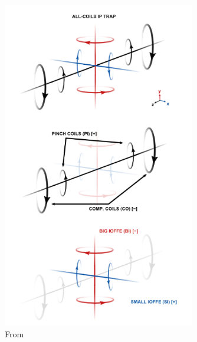 \documentclass{article}
\theoremstyle{definition}
\begin{document}
\begin{figure}[!htb]
	\centering
	\includegraphics[width=0.75\textwidth]{all-coils.png}
	\caption{From \cite{allcoil}}
\end{figure}



\typeout{}
 
	
\end{document}
